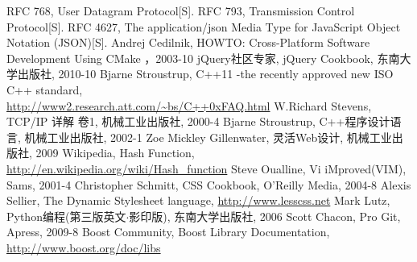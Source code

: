 \documentclass{data/hbue}
\begin{document}





\frontmatter{} %

\tableofcontents

\mainmatter












\backmatter


\begin{thebibliography}{99}
		RFC 768, User Datagram Protocol[S].
		RFC 793, Transmission Control Protocol[S].
		RFC 4627, The application/json Media Type for JavaScript Object
		Notation (JSON)[S].
		Andrej Cedilnik, HOWTO: Cross-Platform Software Development Using CMake
		，2003-10
		jQuery社区专家, jQuery Cookbook, 东南大学出版社, 2010-10
		Bjarne Stroustrup, C++11 -the recently approved new ISO C++ standard,\\
		\url{http://www2.research.att.com/~bs/C++0xFAQ.html}
		W.Richard Stevens, TCP/IP 详解 卷1, 机械工业出版社, 2000-4
		Bjarne Stroustrup, C++程序设计语言, 机械工业出版社, 2002-1
		Zoe Mickley Gillenwater, 灵活Web设计, 机械工业出版社, 2009
		Wikipedia, Hash Function, \url{http://en.wikipedia.org/wiki/Hash\_function}
		Steve Oualline, Vi iMproved(VIM), Sams, 2001-4
		Christopher Schmitt, CSS Cookbook, O'Reilly Media, 2004-8
		Alexis Sellier, The Dynamic Stylesheet language, \url{http://www.lesscss.net}
		Mark Lutz, Python编程(第三版英文$\cdot$影印版), 东南大学出版社, 2006
		Scott Chacon, Pro Git, Apress, 2009-8
		Boost Community, Boost Library Documentation,
		\url{http://www.boost.org/doc/libs}
\end{thebibliography}
\end{document}
